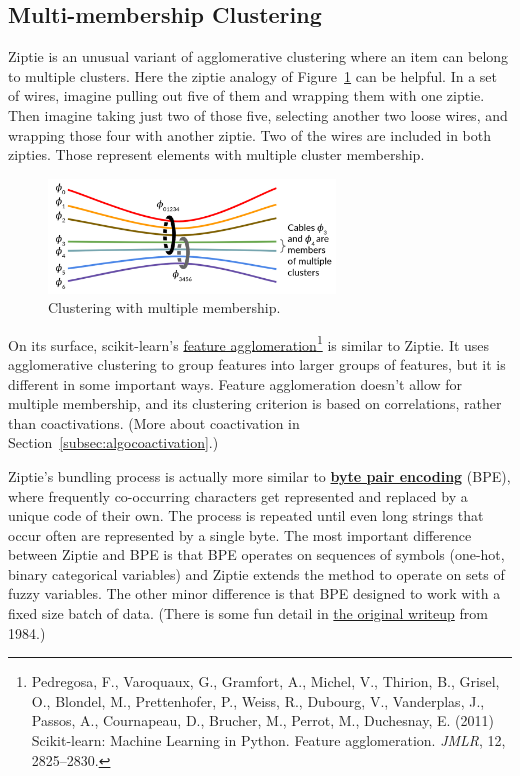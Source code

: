 \subsection{Multi-membership Clustering}
\label{subsec:multimembership}

Ziptie is an unusual variant of agglomerative clustering where an item
can belong to multiple clusters. Here the ziptie analogy of
Figure~\ref{fig:multimember} can be helpful.
In a set of wires, imagine pulling out five of them and wrapping them
with one ziptie. Then imagine taking just two of those five, selecting another
two loose wires, and wrapping those four with another ziptie.
Two of the wires are included in both zipties. Those represent elements
with multiple cluster membership.

\begin{figure}[ht]
\vskip 0.0in
\begin{center}
\centerline{\includegraphics[width=3.0in]{images/multimember.png}}
\caption{Clustering with multiple membership.}
\label{fig:multimember}
\end{center}
\vskip -0.2in
\end{figure}

On its surface,
scikit-learn's
\href{https://scikit-learn.org/stable/auto_examples/cluster/plot_digits_agglomeration.html#sphx-glr-auto-examples-cluster-plot-digits-agglomeration-py}
{feature agglomeration}\footnote{
Pedregosa, F., Varoquaux, G., Gramfort, A., Michel, V.,
Thirion, B., Grisel, O., Blondel, M., Prettenhofer, P.,
Weiss, R., Dubourg, V., Vanderplas, J., Passos, A.,
Cournapeau, D., Brucher, M., Perrot, M., Duchesnay, E. (2011)
Scikit-learn: Machine Learning in Python. Feature agglomeration.
\textit{JMLR}, 12, 2825–2830.}
is similar to Ziptie.
It uses agglomerative clustering to group
features into larger groups of features, but it is different in
some important ways. Feature agglomeration doesn't allow for
multiple membership, and its clustering criterion is based on
correlations, rather than coactivations. (More about coactivation in
Section~\ref{subsec:algocoactivation}.)

Ziptie's bundling process is actually more similar to
\textbf{
\href{https://en.wikipedia.org/wiki/Byte_pair_encoding}
{byte pair encoding}} (BPE),
where frequently co-occurring characters get represented
and replaced by a unique code
of their own. The process is repeated until even long strings that
occur often are represented by a single byte.
The most important difference between Ziptie and BPE is that
BPE operates on sequences of symbols (one-hot, binary categorical variables)
and Ziptie extends the method to operate on sets of fuzzy variables.
The other minor difference is that BPE designed to work with a fixed
size batch of data. (There is some fun detail in
\href{http://www.pennelynn.com/Documents/CUJ/HTML/94HTML/19940045.HTM}
{the original writeup} from 1984.)

